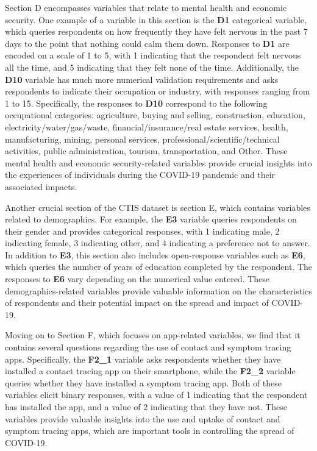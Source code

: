 Section D encompasses variables that relate to mental health and economic security. One example of a variable in this section is the \textbf{D1} categorical variable, which queries respondents on how frequently they have felt nervous in the past 7 days to the point that nothing could calm them down. Responses to \textbf{D1} are encoded on a scale of 1 to 5, with 1 indicating that the respondent felt nervous all the time, and 5 indicating that they felt none of the time. Additionally, the \textbf{D10} variable has much more numerical validation requirements and asks respondents to indicate their occupation or industry, with responses ranging from 1 to 15. Specifically, the responses to \textbf{D10} correspond to the following occupational categories: agriculture, buying and selling, construction, education, electricity/water/gas/waste, financial/insurance/real estate services, health, manufacturing, mining, personal services, professional/scientific/technical activities, public administration, tourism, transportation, and Other. These mental health and economic security-related variables provide crucial insights into the experiences of individuals during the COVID-19 pandemic and their associated impacts.

Another crucial section of the CTIS dataset is section E, which contains variables related to demographics. For example, the \textbf{E3} variable queries respondents on their gender and provides categorical responses, with 1 indicating male, 2 indicating female, 3 indicating other, and 4 indicating a preference not to answer. In addition to \textbf{E3}, this section also includes open-response variables such as \textbf{E6}, which queries the number of years of education completed by the respondent. The responses to \textbf{E6} vary depending on the numerical value entered. These demographics-related variables provide valuable information on the characteristics of respondents and their potential impact on the spread and impact of COVID-19.

Moving on to Section F, which focuses on app-related variables, we find that it contains several questions regarding the use of contact and symptom tracing apps. Specifically, the \textbf{F2\_1} variable asks respondents whether they have installed a contact tracing app on their smartphone, while the \textbf{F2\_2} variable queries whether they have installed a symptom tracing app. Both of these variables elicit binary responses, with a value of 1 indicating that the respondent has installed the app, and a value of 2 indicating that they have not. These variables provide valuable insights into the use and uptake of contact and symptom tracing apps, which are important tools in controlling the spread of COVID-19.


